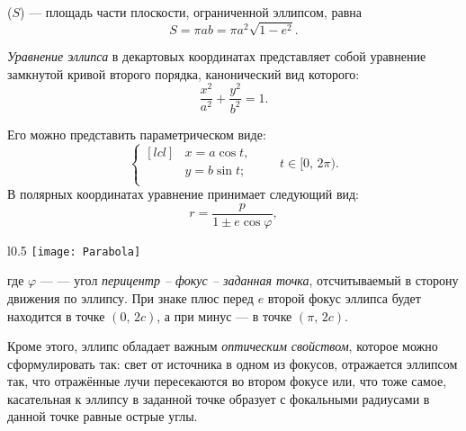  ($S$) --- площадь части 
плоскости, ограниченной эллипсом, равна
\begin{equation}
S=\pi ab = \pi a^2 \sqrt{1-e^2}.
\end{equation}


{\itshape Уравнение эллипса} в декартовых координатах 
представляет собой уравнение замкнутой кривой второго 
порядка, канонический вид которого:
\begin{equation}
\frac{x^2}{a^2}+\frac{y^2}{b^2}=1.
\end{equation}

Его можно представить параметрическом виде:\begin{equation}
\left\{\begin{aligned}[lcl]
&x=a\cos t,\\
&y=b\sin t;\\
\end{aligned}
\right. \quad\quad t \in [0, \, 2\pi).
\end{equation}
В полярных координатах уравнение принимает следующий вид:
\begin{equation}
r=\frac{p}{1\pm e \cos \varphi},
\label{eq:ellipse-pol-eq}
\end{equation} 
\begin{wrapfigure}[11]{l}{0.5\tw}
	\centering
	\vspace{-.7pc}
	\texttt{[image: Parabola]}
\end{wrapfigure}
где $\varphi$ ---  --- угол 
{\slshape перицентр -- фокус -- заданная точка}, 
отсчитываемый в сторону движения по эллипсу. При 
знаке плюс перед $e$ второй фокус эллипса будет 
находится в точке $(0, \, 2c)$, а при минус --- в 
точке $(\pi, \, 2c)$.

Кроме этого, эллипс обладает важным {\itshape оптическим 
свойством}, которое можно сформулировать так: свет от источника в одном из фокусов, 
	отражается эллипсом так, что отражённые лучи пересекаются 
	во втором фокусе или, что тоже самое, касательная к эллипсу в заданной точке образует с фокальными радиусами в данной точке равные острые углы.






 
